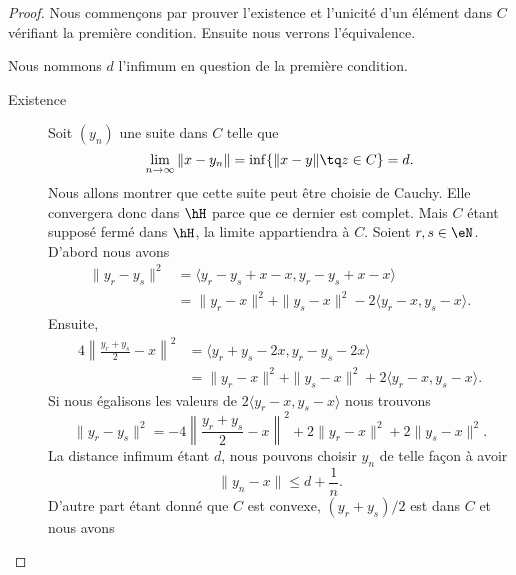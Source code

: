 \begin{proof}
	Nous commençons par prouver l'existence et l'unicité d'un élément dans \( C\) vérifiant la première condition. Ensuite nous verrons l'équivalence.

	Nous nommons \( d\) l'infimum en question de la première condition.
	\begin{description}
		\item[Existence]
		      Soit \( (y_n)\) une suite dans \( C\) telle que
		      \begin{equation}
			      \lim_{n\to \infty} \| x-y_n \|=\inf\{ \| x-y \|\tq z\in C \}=d.
		      \end{equation}
		      Nous allons montrer que cette suite peut être choisie de Cauchy. Elle convergera donc dans \( \hH\) parce que ce dernier est complet. Mais \( C\) étant supposé fermé dans \( \hH\), la limite appartiendra à \( C\). Soient \( r,s\in \eN\). D'abord nous avons
		      \begin{subequations}
			      \begin{align}
				      \| y_r-y_s \|^2 & =\langle y_r-y_s+x-x, y_r-y_s+x-x\rangle                    \\
				                      & =\| y_r-x \|^2+\| y_s-x \|^2-2\langle y_r-x, y_s-x\rangle .
			      \end{align}
		      \end{subequations}
		      Ensuite,
		      \begin{subequations}
			      \begin{align}
				      4\left\| \frac{ y_r+y_s }{2}-x \right\|^2 & =\langle y_r+y_s-2x, y_r-y_s-2x\rangle                      \\
				                                                & =\| y_r-x \|^2+\| y_s-x \|^2+2\langle y_r-x, y_s-x\rangle .
			      \end{align}
		      \end{subequations}
		      Si nous égalisons les valeurs de \( 2\langle y_r-x, y_s-x\rangle \) nous trouvons
		      \begin{equation}    \label{EqiqCyUa}
			      \| y_r-y_s \|^2=-4\left\| \frac{ y_r+y_s }{2}-x \right\|^2+2\| y_r-x \|^2+2\| y_s-x \|^2.
		      \end{equation}
		      La distance infimum étant \( d\), nous pouvons choisir \( y_n\) de telle façon à avoir
		      \begin{equation}
			      \| y_n-x \|\leq d+\frac{1}{ n }.
		      \end{equation}
		      D'autre part étant donné que \( C\) est convexe, \( (y_r+y_s)/2\) est dans \( C\) et nous avons

\end{description}
\end{proof}
